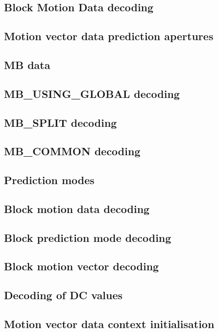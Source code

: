 
\subsection{Block Motion Data decoding}
\subsection{Motion vector data prediction apertures}
\subsection{MB data}
\subsection{MB\_USING\_GLOBAL decoding}
\subsection{MB\_SPLIT decoding}
\subsection{MB\_COMMON decoding}
\subsection{Prediction modes}
\subsection{Block motion data decoding}
\subsection{Block prediction mode decoding}
\subsection{Block motion vector decoding}
\subsection{Decoding of DC values}
\subsection{Motion vector data context initialisation}
